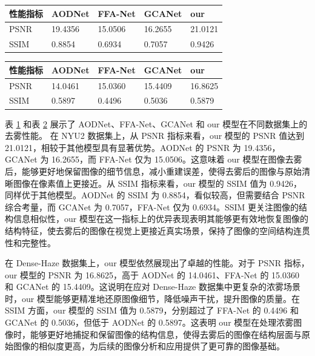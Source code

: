 \begin{table}[H]
    \centering
    \captionsetup{font=footnotesize}
    \label{tab:compare_studies_nyu2}
    \begin{tabular}{p{}p{}p{}p{}p{}}
        \toprule
        性能指标 & AODNet  & FFA-Net & GCANet & our   \\ 
        \midrule
        PSNR    & 19.4356 & 15.0506 & 16.2655 & 21.0121 \\
        SSIM    & 0.8854  & 0.6934  & 0.7057  & 0.9426  \\
        \bottomrule
    \end{tabular}
\end{table}
\begin{table}[H]
    \centering
    \captionsetup{font=footnotesize}
    \label{tab:compare_studies_dh}
    \begin{tabular}{p{}p{}p{}p{}p{}}
        \toprule
        性能指标 & AODNet  & FFA-Net & GCANet  & our   \\ 
        \midrule
        PSNR    & 14.0461 & 15.0360 & 15.4409 & 16.8625 \\
        SSIM    & 0.5897  & 0.4496  & 0.5036  & 0.5879 \\
        \bottomrule
    \end{tabular}
\end{table}

表 \ref{tab:compare_studies_nyu2} 和表 \ref{tab:compare_studies_dh} 展示了 AODNet、FFA-Net、GCANet 和 our 模型在不同数据集上的去雾性能。
在 NYU2 数据集上，从 PSNR 指标来看，our 模型的 PSNR 值达到 21.0121，相较于其他模型具有显著优势。AODNet 的 PSNR 为 19.4356，GCANet 为 16.2655，而 FFA-Net 仅为 15.0506。这意味着 our 模型在图像去雾后，能够更好地保留图像的细节信息，减小重建误差，使得去雾后的图像与原始清晰图像在像素值上更接近。从 SSIM 指标来看，our 模型的 SSIM 值为 0.9426，同样优于其他模型。AODNet 的 SSIM 为 0.8854，看似较高，但需要结合 PSNR 综合考量，而 GCANet 为 0.7057，FFA-Net 仅为 0.6934。SSIM 更关注图像的结构信息相似性，our 模型在这一指标上的优异表现表明其能够更有效地恢复图像的结构特征，使去雾后的图像在视觉上更接近真实场景，保持了图像的空间结构连贯性和完整性。

在 Dense-Haze 数据集上，our 模型依然展现出了卓越的性能。对于 PSNR 指标，our 模型的 PSNR 为 16.8625，高于 AODNet 的 14.0461、FFA-Net 的 15.0360 和 GCANet 的 15.4409。这说明在应对 Dense-Haze 数据集中更复杂的浓雾场景时，our 模型能够更精准地还原图像细节，降低噪声干扰，提升图像的质量。在 SSIM 方面，our 模型的 SSIM 值为 0.5879，分别超过了 FFA-Net 的 0.4496 和 GCANet 的 0.5036，但低于 AODNet 的 0.5897。这表明 our 模型在处理浓雾图像时，能够更好地捕捉和保留图像的结构信息，使得去雾后的图像在结构层面与原始图像的相似度更高，为后续的图像分析和应用提供了更可靠的图像基础。

